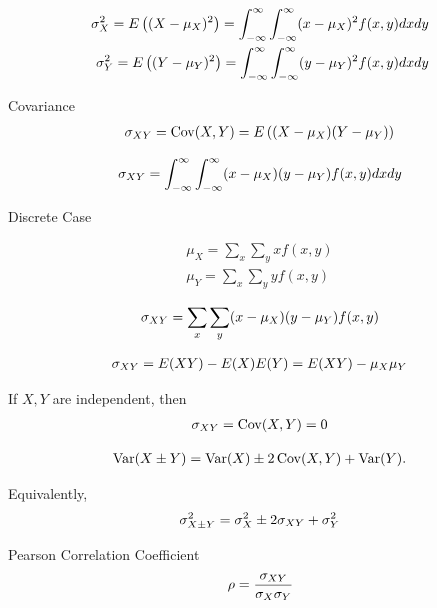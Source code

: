 \[
 \label{eq:2.9.20}
 \begin{split}
  \sigma^{2}_{X}=E\left( (X-\mu_{X})^{2} \right)=\int_{-\infty}^{\infty}\int_{-\infty}^{\infty} (x-\mu_{X})^2f(x,y)dxdy\\ 
  \sigma^{2}_{Y}=E\left( (Y-\mu_{Y})^{2} \right)=\int_{-\infty}^{\infty}\int_{-\infty}^{\infty} (y-\mu_{Y})^2f(x,y)dxdy
 \end{split}
\]

{Covariance}
 \begin{align}
 \label{eq:2.9.21}
  \sigma_{XY}=\operatorname{Cov}(X,Y)=E\left( (X-\mu_{X})(Y-\mu_{Y}) \right)
 \end{align}

 \begin{align}
  \label{eq:2.9.22}
  \sigma_{XY}=\int_{-\infty}^{\infty}
  \int_{-\infty}^{\infty}
  (x-\mu_{X})(y-\mu_{Y})f(x,y)dxdy
 \end{align}

{Discrete Case}

 \[
  \begin{split}
   \mu_{X}=\sum_{x}\sum_{y}xf(x,y) \\
  \mu_{Y}=\sum_{x}\sum_{y}yf(x,y)
  \end{split}
 \]

 \begin{align}
  \label{eq:2.9.23}
  \sigma_{XY}=\sum_{x}\sum_{y}(x-\mu_{X})(y-\mu_{Y})f(x,y)
 \end{align}

 \begin{align}
  \label{eq:2.9.24}
  \sigma_{XY}=E(XY)-E(X)E(Y)=E(XY)-\mu_{X}\mu_{Y}
 \end{align}

 If $X,Y$ are independent, then
 \begin{align}
  \label{eq:2.9.24a}
  \sigma_{XY}=\operatorname{Cov}(X,Y)=0
 \end{align}

 \begin{align}
  \label{eq:2.9.25}
  \operatorname{Var}(X\pm Y)=\operatorname{Var}(X)\pm2\operatorname{Cov}(X,Y)+\operatorname{Var}(Y).
 \end{align}

 Equivalently,
 \begin{align}
  \label{eq:2.9.26}
  \sigma_{X\pm Y}^{2}=\sigma_{X}^{2} \pm 2\sigma_{XY} +\sigma_{Y}^{2}
 \end{align}

{Pearson Correlation Coefficient}
 \begin{align}
  \label{eq:2.9.27}
  \rho = \dfrac{\sigma_{XY}}{\sigma_{X}\sigma_{Y}}
 \end{align}

